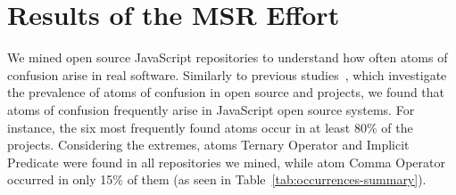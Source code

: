 
\section{Results of the MSR Effort}
\label{sec:msr-results} 

We mined \minedprojects open source JavaScript repositories to understand how
often atoms of confusion arise in real software. 
Similarly to previous studies~\cite{DBLP:conf/msr/GopsteinZFC18,DBLP:journals/ese/MedeirosLAAKRG19}, which investigate
the prevalence of atoms of confusion in open source \clang and \cpplang projects, we found that atoms of confusion
frequently arise in JavaScript open source systems. For instance, the six most frequently found atoms
occur in at least 80\% of the projects. Considering the extremes, atoms Ternary Operator and Implicit Predicate were found in all repositories we mined,
while atom Comma Operator occurred in only 15\% of them (as seen in Table~\ref{tab:occurrences-summary}).

